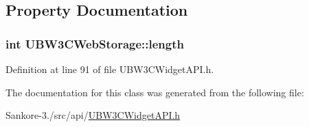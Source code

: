 \subsection{Property Documentation}
\hypertarget{class_u_b_w3_c_web_storage_a4bcb42e43fb0829c80d1fa683a9517ea}{
\subsubsection[{length}]{\setlength{\rightskip}{0pt plus 5cm}int U\-B\-W3\-C\-Web\-Storage\-::length\hspace{0.3cm}{\ttfamily [read]}}}\label{db/de3/class_u_b_w3_c_web_storage_a4bcb42e43fb0829c80d1fa683a9517ea}


Definition at line 91 of file U\-B\-W3\-C\-Widget\-A\-P\-I.\-h.



The documentation for this class was generated from the following file\-:\begin{DoxyCompactItemize}
\item 
Sankore-\/3./src/api/\hyperlink{_u_b_w3_c_widget_a_p_i_8h}{U\-B\-W3\-C\-Widget\-A\-P\-I.\-h}\end{DoxyCompactItemize}
